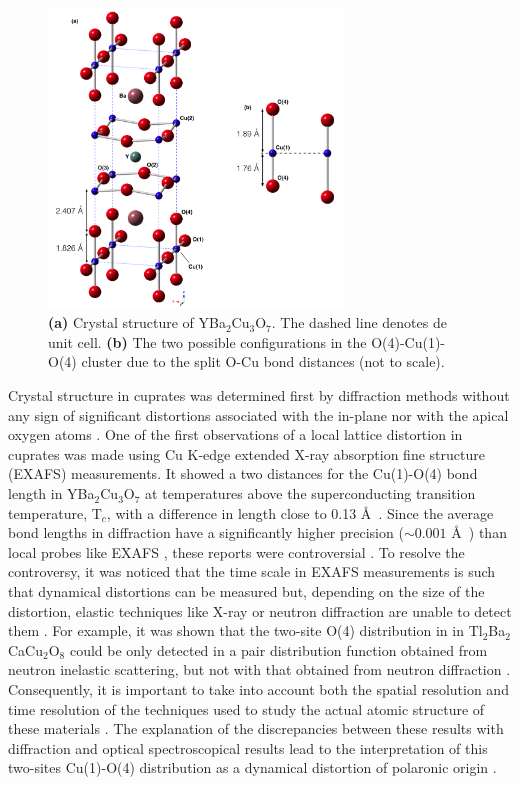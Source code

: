 \begin{figure}[ht]
  \centering
  \includegraphics[width=0.7\textwidth]{images/YBCO_O-Cu-O.jpg}
  \caption[Crystal structure of YBa$_{2}$Cu$_{3}$O$_{7}$ and the two possible O(4)-Cu(1)-O(4) configurations.]
  {\textbf{(a)} Crystal structure of YBa$_{2}$Cu$_{3}$O$_{7}$. The dashed line denotes de unit cell. \textbf{(b)} The two possible configurations in the O(4)-Cu(1)-O(4) cluster due to the split O-Cu bond distances (not to scale).}
\label{fig:YBCO_structure}
\end{figure}

Crystal structure in cuprates was determined first by diffraction methods without any sign of significant distortions associated with the in-plane nor with the apical oxygen atoms \cite{Capponi1987,Schafer1988}. 
One of the first observations of a local lattice distortion in cuprates was made using Cu K-edge extended X-ray absorption fine structure (EXAFS) measurements.
It showed a two distances for the Cu(1)-O(4) bond length in YBa$_2$Cu$_3$O$_7$ at temperatures above the superconducting transition temperature, T$_{c}$, with a difference in length close to 0.13 \AA\ \cite{MustredeLeon1990,Conradson1990}.
Since the average bond lengths in diffraction have a significantly higher precision ($\sim 0.001$ \AA\ \cite{Miceli1988}) than local probes like EXAFS \cite{Rehr2000}, these reports were controversial \cite{Kwei1990}.
To resolve the controversy, it was noticed that the time scale in EXAFS measurements is such that dynamical distortions can be measured but, depending on the size of the distortion, elastic techniques like X-ray or neutron diffraction are unable to detect them \cite{Salkola1995}.
For example, it was shown that the two-site O(4) distribution in in Tl$_{2}$Ba$_{2}$CaCu$_{2}$O$_{8}$ could be only detected in a pair distribution function obtained from neutron inelastic scattering, but not with that obtained from neutron diffraction \cite{Egami1991}. 
Consequently, it is important to take into account both the spatial resolution and time resolution of the techniques used to study the actual atomic structure of these materials \cite{Mihailovic2005}. 
The explanation of the discrepancies between these results with diffraction and optical spectroscopical results lead to the interpretation of this two-sites Cu(1)-O(4) distribution as a dynamical distortion of polaronic origin \cite{MustredeLeon1992}.

